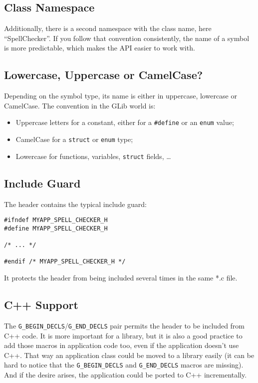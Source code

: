\subsection{Class Namespace}
Additionally, there is a second namespace with the class name, here ``SpellChecker''. If you follow that convention consistently, the name of a symbol is more predictable, which makes the API easier to work with.

\subsection{Lowercase, Uppercase or CamelCase?}
Depending on the symbol type, its name is either in uppercase, lowercase or CamelCase. The convention in the GLib world is:
\begin{itemize}
  \item Uppercase letters for a constant, either for a \lstinline{#define} or an \lstinline{enum} value;
  \item CamelCase for a \lstinline{struct} or \lstinline{enum} type;
  \item Lowercase for functions, variables, \lstinline{struct} fields, …
\end{itemize}

\subsection{Include Guard}
The header contains the typical include guard:

\begin{lstlisting}
#ifndef MYAPP_SPELL_CHECKER_H
#define MYAPP_SPELL_CHECKER_H

/* ... */

#endif /* MYAPP_SPELL_CHECKER_H */
\end{lstlisting}

It protects the header from being included several times in the same *.c file.

\subsection{C++ Support}
The \lstinline{G_BEGIN_DECLS}/\lstinline{G_END_DECLS} pair permits the header to be included from C++ code. It is more important for a library, but it is also a good practice to add those macros in application code too, even if the application doesn't use C++. That way an application class could be moved to a library easily (it can be hard to notice that the \lstinline{G_BEGIN_DECLS} and \lstinline{G_END_DECLS} macros are missing). And if the desire arises, the application could be ported to C++ incrementally.

